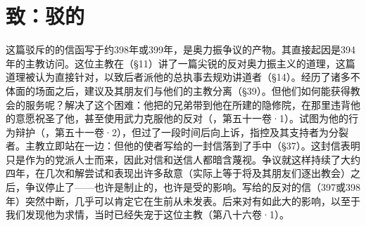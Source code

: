 
\chapter{致：驳的}


这篇驳斥的的信函写于约398年或399年，是奥力振争议的产物。其直接起因是394年的主教访问。这位主教在（§11）讲了一篇尖锐的反对奥力振主义的道理，这篇道理被认为直接针对，以致后者派他的总执事去规劝讲道者（§14）。经历了诸多不体面的场面之后，建议及其朋友们与他们的主教分离（§39）。但他们如何能获得教会的服务呢？解决了这个困难：他把的兄弟带到他在所建的隐修院，在那里违背他的意愿祝圣了他，甚至使用武力克服他的反对（，第五十一卷·1）。试图为他的行为辩护（，第五十一卷·2），但过了一段时间后向上诉，指控及其支持者为分裂者。主教立即站在一边：但他的使者写给的一封信落到了手中（§37）。这封信表明只是作为的党派人士而来，因此对信和送信人都暗含蔑视。争议就这样持续了大约四年，在几次和解尝试和表现出许多敌意（实际上等于将及其朋友们逐出教会）之后，争议停止了——也许是制止的，也许是受的影响。写给的反对的信（397或398年）突然中断，几乎可以肯定它在生前从未发表。后来对有如此大的影响，以至于我们发现他为求情，当时已经失宠于这位主教（第八十六卷·1）。\par

